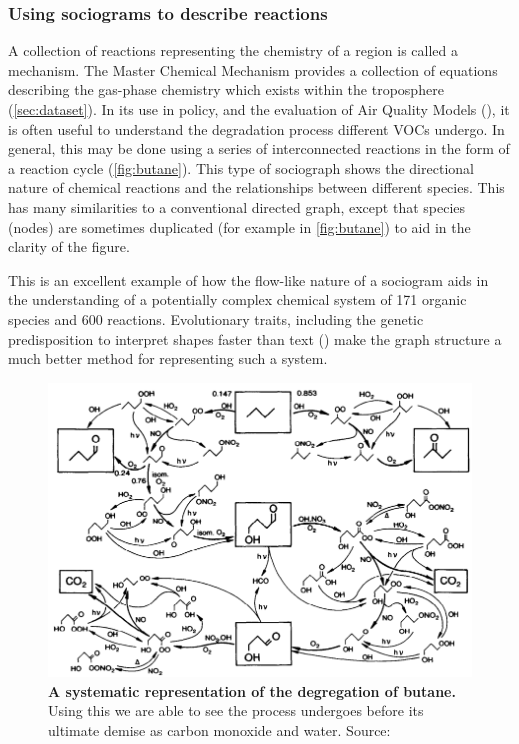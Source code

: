 \subsubsection{Using sociograms to describe reactions}

A collection of reactions representing the chemistry of a region is called a mechanism. The Master Chemical Mechanism \citep{mcm} provides a collection of equations describing the gas-phase chemistry which exists within the troposphere (\autoref{sec:dataset}). In its use in policy, and the evaluation of Air Quality Models (\citep{defra1}), it is often useful to understand the degradation process different VOCs undergo. In general, this may be done using a series of interconnected reactions in the form of a reaction cycle (\autoref{fig:butane}). This type of sociograph shows the directional nature of chemical reactions and the relationships between different species. This has many similarities to a conventional directed graph, except that species (nodes) are sometimes duplicated (for example  in \autoref{fig:butane}) to aid in the clarity of the figure.

This is an excellent example of how the flow-like nature of a sociogram aids in the understanding of a potentially complex chemical system of 171 organic species and 600 reactions. Evolutionary traits, including the genetic predisposition to interpret shapes faster than text (\citep{sapiens}) make the graph structure a much better method for representing such a system.

\begin{figure}[H]
    \centering
        \includegraphics[width=\textwidth]{figures_c1/butane.png}

       \caption{\textbf{A systematic representation of the degregation of butane.} Using this we are able to see the process  undergoes before its ultimate demise as carbon monoxide and water. Source: \citep{butane} }
       \label{fig:butane}
\end{figure}

